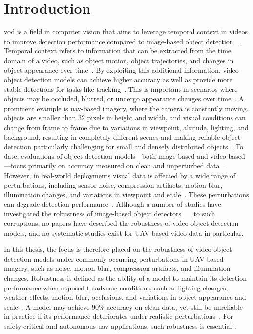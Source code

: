 \documentclass[final,twoside]{vutinfth}
\begin{document}
\chapter{Introduction}
\gls{vod} is a field in computer vision that aims to leverage temporal context in videos to improve detection performance compared to image-based object detection~\cite{chen2020memoryenhancedgloballocalaggregation}~\cite{zhu2017flowguidedfeatureaggregationvideo}.
Temporal context refers to information that can be extracted from the time domain of a video, such as object motion, object trajectories, and changes in object appearance over time~\cite{carreira2017quo}.
By exploiting this additional information, video object detection models can achieve higher accuracy as well as provide more stable detections for tasks like tracking~\cite{zhou2022transvod}.
This is important in scenarios where objects may be occluded, blurred, or undergo appearance changes over time~\cite{zhu2017flowguidedfeatureaggregationvideo}.
A prominent example is \gls{uav}-based imagery, where the camera is constantly moving, objects are smaller than 32 pixels in height and width, and visual conditions can change from frame to frame due to variations in viewpoint, altitude, lighting, and background, resulting in completely different scenes and making reliable object detection particularly challenging for small and densely distributed objects~\cite{zhu2021detection}.
To date, evaluations of object detection models—both image-based and video-based—focus primarily on accuracy measured on clean and unperturbed data~\cite{hendrycks2019benchmarking}.
However, in real-world deployments visual data is affected by a wide range of perturbations, including sensor noise, compression artifacts, motion blur, illumination changes, and variations in viewpoint and scale~\cite{russakovsky2015ImageNet}.
These perturbations can degrade detection performance~\cite{russakovsky2015ImageNet}.
Although a number of studies have investigated the robustness of image-based object detectors~\cite{hendrycks2019benchmarking}~\cite{liu2024UAVRobustness}~\cite{michaelis2019benchmarking} to such corruptions, no papers have described the robustness of video object detection models, and no systematic studies exist for UAV-based video data in particular.

In this thesis, the focus is therefore placed on the robustness of video object detection models under commonly occurring perturbations in UAV-based imagery, such as noise, motion blur, compression artifacts, and illumination changes.
Robustness is defined as the ability of a model to maintain its detection performance when exposed to adverse conditions, such as lighting changes, weather effects, motion blur, occlusions, and variations in object appearance and scale~\cite{hendrycks2019benchmarking}.
A model may achieve 90\% accuracy on clean data, yet still be unreliable in practice if its performance deteriorates under realistic perturbations~\cite{hendrycks2019benchmarking}.
For safety-critical and autonomous \gls{uav} applications, such robustness is essential~\cite{liu2024UAVRobustness}.
\end{document}
